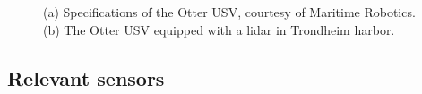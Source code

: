 \begin{figure}[h!]
    \centering
	\caption[Specifications of the Otter USV.]{(a) Specifications of the Otter USV, courtesy of Maritime Robotics. (b) The Otter USV equipped with a lidar in Trondheim harbor.} \label{fig:experimental_platform}
\end{figure}

\subsection{Relevant sensors}

